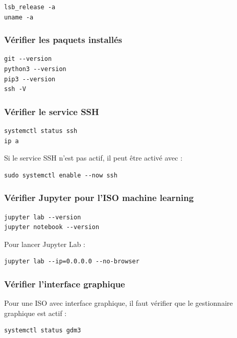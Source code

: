 \documentclass[12pt,a4paper]{article}
\begin{document}
\begin{lstlisting}
lsb_release -a
uname -a
\end{lstlisting}

\subsubsection*{Vérifier les paquets installés}

\begin{lstlisting}
git --version
python3 --version
pip3 --version
ssh -V
\end{lstlisting}

\subsubsection*{Vérifier le service SSH}

\begin{lstlisting}
systemctl status ssh
ip a
\end{lstlisting}

Si le service SSH n'est pas actif, il peut être activé avec :

\begin{lstlisting}
sudo systemctl enable --now ssh
\end{lstlisting}

\subsubsection*{Vérifier Jupyter pour l'ISO machine learning}

\begin{lstlisting}
jupyter lab --version
jupyter notebook --version
\end{lstlisting}

Pour lancer Jupyter Lab :

\begin{lstlisting}
jupyter lab --ip=0.0.0.0 --no-browser
\end{lstlisting}

\subsubsection*{Vérifier l'interface graphique}

Pour une ISO avec interface graphique, il faut vérifier que le gestionnaire graphique est actif :

\begin{lstlisting}
systemctl status gdm3
\end{lstlisting}
\end{document}
